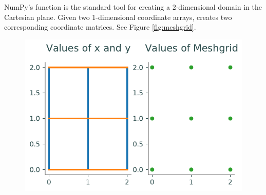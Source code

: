 NumPy's  function is the standard tool for creating a 2-dimensional domain in the Cartesian plane.
Given two 1-dimensional coordinate arrays,  creates two corresponding coordinate matrices.
See Figure \ref{fig:meshgrid}.

\begin{figure}[H] %
%
%
%
%
%

\includegraphics[width=\linewidth]{figures/meshplot_fig.pdf}


\end{figure}

